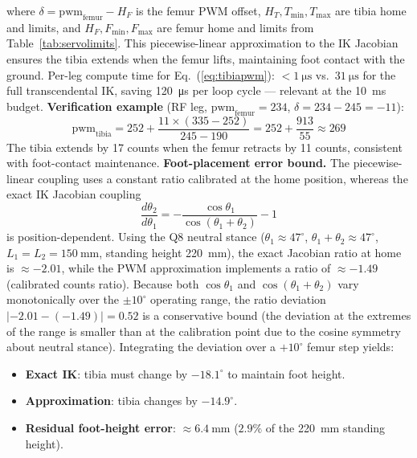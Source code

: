 \documentclass[journal]{IEEEtran}
\newcommand{\dg}{^{\circ}}
\begin{document}
where $\delta = \text{pwm}_\text{femur} - H_F$ is the femur PWM
offset, $H_T, T_\text{min}, T_\text{max}$ are tibia home and
limits, and $H_F, F_\text{min}, F_\text{max}$ are femur home
and limits from Table~\ref{tab:servolimits}.
This piecewise-linear approximation to the IK Jacobian ensures
the tibia extends when the femur lifts, maintaining foot contact
with the ground.
Per-leg compute time for Eq.~(\ref{eq:tibiapwm}): $<\SI{1}{\micro\second}$
vs.\ $\SI{31}{\micro\second}$ for the full transcendental IK,
saving \SI{120}{\micro\second} per loop cycle --- relevant at
the \SI{10}{\milli\second} budget.
\noindent\textbf{Verification example} (RF leg,
$\text{pwm}_\text{femur} = 234$, $\delta = 234-245 = -11$):
\begin{equation*}
\text{pwm}_\text{tibia}
  = 252 + \frac{11 \times (335-252)}{245-190}
  = 252 + \frac{913}{55} \approx 269
\end{equation*}
The tibia extends by 17 counts when the femur retracts by 11
counts, consistent with foot-contact maintenance.
\noindent\textbf{Foot-placement error bound.}
The piecewise-linear coupling uses a constant ratio calibrated
at the home position, whereas the exact IK Jacobian coupling
\begin{equation}
\frac{d\theta_2}{d\theta_1} = -\frac{\cos\theta_1}{\cos(\theta_1+\theta_2)} - 1
\label{eq:ik_jacobian}
\end{equation}
is position-dependent.
Using the Q8 neutral stance ($\theta_1 \approx 47\dg$,
$\theta_1+\theta_2 \approx 47\dg$, $L_1=L_2=\SI{150}{\milli\metre}$,
standing height \SI{220}{\milli\metre}), the exact Jacobian ratio
at home is $\approx{-2.01}$, while the PWM approximation implements
a ratio of $\approx{-1.49}$ (calibrated counts ratio).
Because both $\cos\theta_1$ and $\cos(\theta_1+\theta_2)$ vary
monotonically over the $\pm10\dg$ operating range, the ratio
deviation $|{-2.01}-(-1.49)| = 0.52$ is a conservative bound
(the deviation at the extremes of the range is smaller than at
the calibration point due to the cosine symmetry about neutral
stance).
Integrating the deviation over a $+10\dg$ femur step yields:
\begin{itemize}
  \item \textbf{Exact IK}: tibia must change by $-18.1\dg$ to
        maintain foot height.
  \item \textbf{Approximation}: tibia changes by $-14.9\dg$.
  \item \textbf{Residual foot-height error}: $\approx\SI{6.4}{\milli\metre}$
        ($2.9\%$ of the \SI{220}{\milli\metre} standing height).
\end{itemize}
\end{document}
